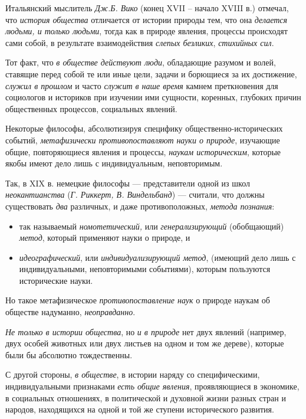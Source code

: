 \documentclass[a4paper,14pt,russian]{extreport}
\begin{document}
Итальянский мыслитель \emph{Дж.Б. Вико} (конец XVII -- начало XVIII в.) отмечал, что \emph{история общества} отличается от истории природы тем, что она \emph{делается людьми, и только людьми}, тогда как в природе явления, процессы происходят сами собой, в результате взаимодействия \emph{слепых безликих}, \emph{стихийных сил}.

Тот факт, что \emph{в обществе действуют люди}, обладающие разумом и волей, ставящие перед собой те или иные цели, задачи и борющиеся за их достижение, \emph{служил в прошлом} и часто \emph{служит в наше время} камнем преткновения для социологов и историков при изучении ими сущности, коренных, глубоких причин общественных процессов, социальных явлений.

Некоторые философы, абсолютизируя специфику общественно-исторических событий, \emph{метафизически противопоставляют} \emph{науки о природе}, изучающие общие, повторяющиеся явления и процессы, \emph{наукам историческим}, которые якобы имеют дело лишь с индивидуальным, неповторимым.

Так, в XIX в. немецкие философы --- представители одной из школ \emph{неокантианства} (\emph{Г. Риккерт, В. Виндельбанд}) --- считали, что должны существовать \emph{два} различных, и даже противоположных, \emph{метода познания}:

\begin{itemize}
\item так называемый \emph{номотетический,} или \emph{генерализирующий} (обобщающий) \emph{метод}, который применяют науки о природе, и
\item \emph{идеографический}, или \emph{индивидуализирующий метод}, (имеющий дело лишь с индивидуальными, неповторимыми событиями), которым пользуются исторические науки.
\end{itemize}

Но такое метафизическое \emph{противопоставление наук} о природе наукам об обществе надуманно, \emph{неоправданно}.

\emph{Не только в истории общества}, но \emph{и в природе} нет двух явлений (например, двух особей животных или двух листьев на одном и том же дереве), которые были бы абсолютно тождественны.

С другой стороны, \emph{в обществе}, в истории наряду со специфическими, индивидуальными признаками \emph{есть общие явления}, проявляющиеся в экономике, в социальных отношениях, в политической и духовной жизни разных стран и народов, находящихся на одной и той же ступени исторического развития.
\end{document}
